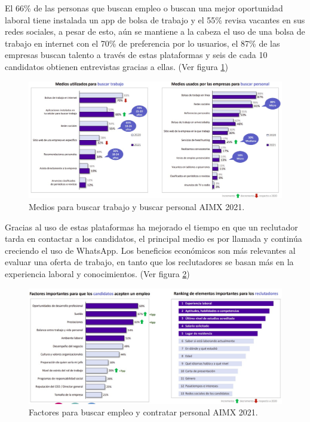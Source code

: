 El 66\% de las personas que buscan empleo o buscan una mejor oportunidad laboral tiene instalada un app de bolsa de trabajo y el 55\%  revisa vacantes en sus redes sociales, a pesar de esto, aún se mantiene a la cabeza el uso de una bolsa de trabajo en internet con el 70\% de preferencia por lo usuarios, el 87\% de las empresas buscan talento a través de estas plataformas y seis de cada 10 candidatos obtienen entrevistas gracias a ellas. \cite{AIMX}(Ver figura \ref{mark:med})

    \begin{figure}[H]
        \begin{center}
            \includegraphics[width=.8\textwidth]{antecedentes/imagenes/medios.jpeg}
        \end{center}
        \caption{Medios para buscar trabajo y buscar personal AIMX 2021.}
        \label{mark:med}
    \end{figure}

 Gracias al uso de estas plataformas ha mejorado el tiempo en que un reclutador tarda en contactar a los candidatos, el principal medio es por llamada y continúa creciendo el uso de WhatsApp. Los beneficios económicos son más relevantes al evaluar una oferta de trabajo, en tanto que los reclutadores se basan más en la experiencia laboral y conocimientos. (Ver figura \ref{mark:fac})
 \\

    \begin{figure}[H]
        \begin{center}
            \includegraphics[width=.8\textwidth]{antecedentes/imagenes/consideraciones.jpeg}
        \end{center}
        \caption{Factores para buscar empleo y contratar personal AIMX 2021.}
        \label{mark:fac}
    \end{figure}

